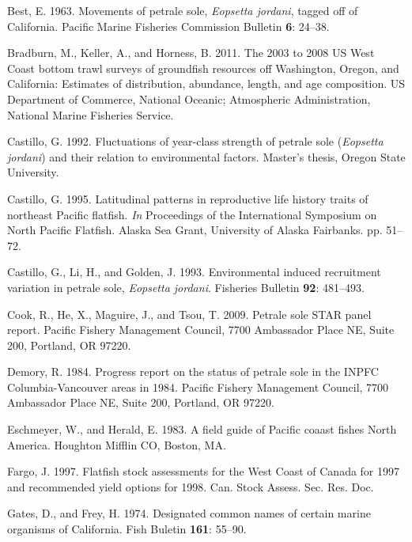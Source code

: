 \documentclass[12pt,]{article}
\begin{document}
\hypertarget{ref-best_e.a._movements_1963}{}
Best, E. 1963. Movements of petrale sole, \emph{Eopsetta jordani},
tagged off of California. Pacific Marine Fisheries Commission Bulletin
\textbf{6}: 24--38.

\hypertarget{ref-bradburn_2003_2011}{}
Bradburn, M., Keller, A., and Horness, B. 2011. The 2003 to 2008 US West
Coast bottom trawl surveys of groundfish resources off Washington,
Oregon, and California: Estimates of distribution, abundance, length,
and age composition. US Department of Commerce, National Oceanic;
Atmospheric Administration, National Marine Fisheries Service.

\hypertarget{ref-castillo_g.c._fluctuations_1992}{}
Castillo, G. 1992. Fluctuations of year-class strength of petrale sole
(\emph{Eopsetta jordani}) and their relation to environmental factors.
Master's thesis, Oregon State University.

\hypertarget{ref-castillo_latitudinal_1995}{}
Castillo, G. 1995. Latitudinal patterns in reproductive life history
traits of northeast Pacific flatfish. \emph{In} Proceedings of the
International Symposium on North Pacific Flatfish. Alaska Sea Grant,
University of Alaska Fairbanks. pp. 51--72.

\hypertarget{ref-castillo_g.c._environmental_1993}{}
Castillo, G., Li, H., and Golden, J. 1993. Environmental induced
recruitment variation in petrale sole, \emph{Eopsetta jordani}.
Fisheries Bulletin \textbf{92}: 481--493.

\hypertarget{ref-cook_petrale_2009}{}
Cook, R., He, X., Maguire, J., and Tsou, T. 2009. Petrale sole STAR
panel report. Pacific Fishery Management Council, 7700 Ambassador Place
NE, Suite 200, Portland, OR 97220.

\hypertarget{ref-demory_progress_1984}{}
Demory, R. 1984. Progress report on the status of petrale sole in the
INPFC Columbia-Vancouver areas in 1984. Pacific Fishery Management
Council, 7700 Ambassador Place NE, Suite 200, Portland, OR 97220.

\hypertarget{ref-eschmeyer_field_1983}{}
Eschmeyer, W., and Herald, E. 1983. A field guide of Pacific coaast
fishes North America. Houghton Mifflin CO, Boston, MA.

\hypertarget{ref-fargo_j.j._flatfish_1997}{}
Fargo, J. 1997. Flatfish stock assessments for the West Coast of Canada
for 1997 and recommended yield options for 1998. Can. Stock Assess. Sec.
Res. Doc.

\hypertarget{ref-gates_designated_1974}{}
Gates, D., and Frey, H. 1974. Designated common names of certain marine
organisms of California. Fish Buletin \textbf{161}: 55--90.
\end{document}
